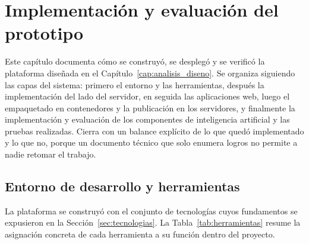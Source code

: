 \chapter{Implementación y evaluación del prototipo}
\label{cap:implementacion}
Este capítulo documenta cómo se construyó, se desplegó y se verificó la plataforma diseñada en
el Capítulo~\ref{cap:analisis_diseno}. Se organiza siguiendo las capas del sistema: primero
el entorno y las herramientas, después la implementación del lado del servidor, en seguida las
aplicaciones web, luego el empaquetado en contenedores y la publicación en los servidores, y
finalmente la implementación y evaluación de los componentes de inteligencia artificial y las pruebas realizadas. Cierra con un balance
explícito de lo que quedó implementado y lo que no, porque un documento técnico que solo enumera
logros no permite a nadie retomar el trabajo.

\section{Entorno de desarrollo y herramientas}
\label{sec:entorno_herramientas}
La plataforma se construyó con el conjunto de tecnologías cuyos fundamentos se expusieron en la
Sección~\ref{sec:tecnologias}. La Tabla~\ref{tab:herramientas} resume la asignación concreta de
cada herramienta a su función dentro del proyecto.


\small
\renewcommand{\arraystretch}{1.25}
\setlength{\tabcolsep}{4pt}

